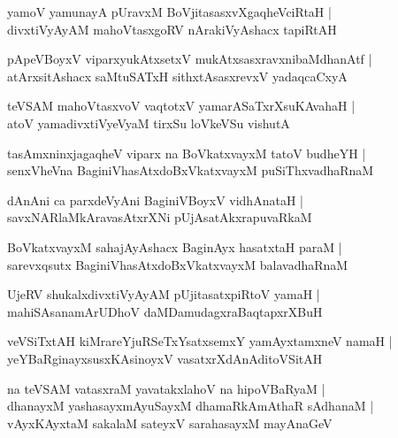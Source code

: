 \documentclass[twoside,12pt,openright]{book}
\newcounter{shloka}[chapter]
\begin{document}
\begin{shloka}%
yamoV yamunayA pUravxM BoVjitasasxvXgaqheVciRtaH |\\
divxtiVyAyAM mahoVtasxgoRV nArakiVyAshacx tapiRtAH 
\end{shloka}

\begin{shloka}%
pApeVBoyxV viparxyukAtxsetxV mukAtxsasxravxnibaMdhanAtf |\\
atArxsitAshacx saMtuSATxH sithxtAsasxrevxV yadaqcaCxyA 
\end{shloka}

\begin{shloka}%
teVSAM mahoVtasxvoV vaqtotxV yamarASaTxrXsuKAvahaH |\\
atoV yamadivxtiVyeVyaM tirxSu loVkeVSu vishutA
\end{shloka}

\begin{shloka}%
tasAmxninxjagaqheV viparx na BoVkatxvayxM tatoV budheYH |\\
senxVheVna BaginiVhasAtxdoBxVkatxvayxM puSiThxvadhaRnaM 
\end{shloka}

\begin{shloka}%
dAnAni ca parxdeVyAni BaginiVBoyxV vidhAnataH |\\
savxNARlaMkAravasAtxrXNi pUjAsatAkxrapuvaRkaM 
\end{shloka}

\begin{shloka}%
BoVkatxvayxM sahajAyAshacx BaginAyx hasatxtaH paraM |\\
sarevxqsutx BaginiVhasAtxdoBxVkatxvayxM balavadhaRnaM 
\end{shloka}

\begin{shloka}%
UjeRV shukalxdivxtiVyAyAM pUjitasatxpiRtoV yamaH |\\
mahiSAsanamArUDhoV daMDamudagxraBaqtapxrXBuH 
\end{shloka}

\begin{shloka}%
veVSiTxtAH kiMrareYjuRSeTxYsatxsemxY yamAyxtamxneV namaH |\\
yeYBaRginayxsusxKAsinoyxV vasatxrXdAnAditoVSitAH 
\end{shloka}

\begin{shloka}%
na teVSAM vatasxraM yavatakxlahoV na hipoVBaRyaM |\\
dhanayxM yashasayxmAyuSayxM dhamaRkAmAthaR sAdhanaM |\\
vAyxKAyxtaM sakalaM sateyxV sarahasayxM mayAnaGeV 
\end{shloka}
\end{document}
